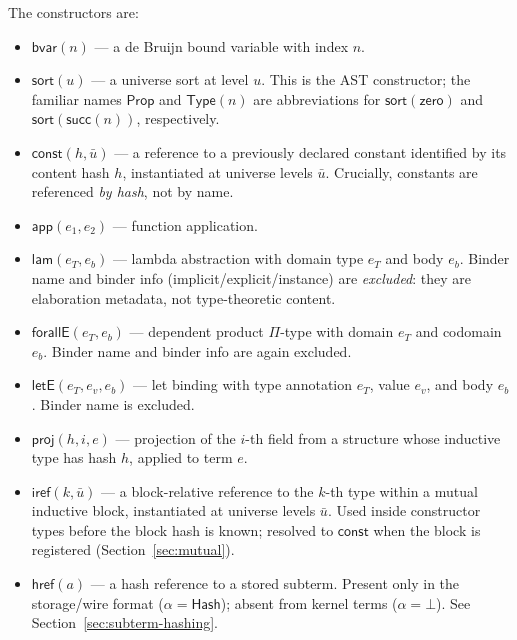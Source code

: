 \documentclass[11pt]{article}
\theoremstyle{definition}
\theoremstyle{plain}
\theoremstyle{remark}
\newcommand{\Prop}{\textsf{Prop}}
\newcommand{\Type}{\textsf{Type}}
\newcommand{\bvar}{\textsf{bvar}}
\newcommand{\const}{\textsf{const}}
\newcommand{\app}{\textsf{app}}
\newcommand{\lam}{\textsf{lam}}
\newcommand{\forallE}{\textsf{forallE}}
\newcommand{\letE}{\textsf{letE}}
\newcommand{\proj}{\textsf{proj}}
\newcommand{\sort}{\textsf{sort}}
\newcommand{\hrefE}{\textsf{href}}
\begin{document}
The constructors are:
\begin{itemize}[nosep]
  \item $\bvar(n)$ --- a de Bruijn bound variable with index $n$.
  \item $\sort(u)$ --- a universe sort at level $u$.
        This is the AST constructor; the familiar names $\Prop$ and $\Type(n)$ are
        abbreviations for $\sort(\textsf{zero})$ and $\sort(\textsf{succ}(n))$, respectively.
  \item $\const(h, \bar{u})$ --- a reference to a previously declared constant identified by its content hash $h$, instantiated at universe levels $\bar{u}$.
        Crucially, constants are referenced \emph{by hash}, not by name.
  \item $\app(e_1, e_2)$ --- function application.
  \item $\lam(e_T, e_b)$ --- lambda abstraction with domain type $e_T$ and body $e_b$.
        Binder name and binder info (implicit/explicit/instance) are \emph{excluded}: they are elaboration metadata, not type-theoretic content.
  \item $\forallE(e_T, e_b)$ --- dependent product $\Pi$-type with domain $e_T$ and codomain $e_b$.
        Binder name and binder info are again excluded.
  \item $\letE(e_T, e_v, e_b)$ --- let binding with type annotation $e_T$, value $e_v$, and body $e_b$.
        Binder name is excluded.
  \item $\proj(h, i, e)$ --- projection of the $i$-th field from a structure whose inductive type has hash $h$, applied to term $e$.
  \item $\textsf{iref}(k, \bar{u})$ --- a block-relative reference to the $k$-th type within a mutual inductive block, instantiated at universe levels $\bar{u}$.
        Used inside constructor types before the block hash is known; resolved to $\const$ when the block is registered (Section~\ref{sec:mutual}).
  \item $\hrefE(a)$ --- a hash reference to a stored subterm.
        Present only in the storage/wire format ($\alpha = \textsf{Hash}$); absent from kernel terms ($\alpha = \bot$).
        See Section~\ref{sec:subterm-hashing}.
\end{itemize}
\end{document}
